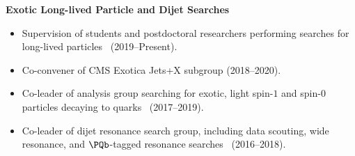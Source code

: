 \documentclass[11pt]{res}
\begin{document}
\begin{resume}
  \textbf{Exotic Long-lived Particle and Dijet Searches}
  \begin{itemize}
    \itemsep-0.3em
    \item Supervision of students and postdoctoral researchers performing searches for long-lived particles~\cite{CMS:2025rtd,CMS:2024zqs,CMS:2024ake,CMS:2024bvl,CMS:2022wjc,CMS:2021yhb,CMS:2021juv} ({2019--Present}).
    \item Co-convener of CMS Exotica Jets+X subgroup ({2018--2020}).
    \item Co-leader of analysis group searching for exotic, light spin-$1$ and spin-$0$ particles decaying to quarks~\cite{Sirunyan:2019vxa,Sirunyan:2019sgo,Sirunyan:2018ikr,Sirunyan:2017nvi} ({2017--2019}).
    \item Co-leader of dijet resonance search group, including data scouting, wide resonance, and $\PQb$-tagged resonance searches~\cite{CMS:2024zhe,Sirunyan:2019pnb,Sirunyan:2019vgj,CMS-PAS-EXO-17-026,Duarte:2018bsd,Sirunyan:2018xlo,Sirunyan:2016iap} ({2016--2018}).
  \end{itemize}


\end{resume}
\end{document}
